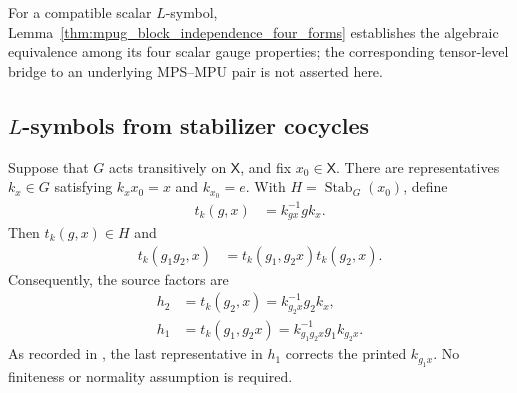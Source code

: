 For a compatible scalar $L$-symbol,
Lemma~\ref{thm:mpug_block_independence_four_forms} establishes the
algebraic equivalence among its four scalar gauge properties; the corresponding
tensor-level bridge to an underlying MPS--MPU pair is not asserted here.

\subsection{\texorpdfstring{$L$}{L}-symbols from stabilizer cocycles}

\begin{lemma}
    \label{thm:mpug_stabilizer_transition}
    \leanok
    Suppose that $G$ acts transitively on $\mathsf X$, and fix
    $x_0\in\mathsf X$. There are representatives $k_x\in G$ satisfying
    $k_xx_0=x$ and $k_{x_0}=e$. With
    $H=\operatorname{Stab}_G(x_0)$, define
    \begin{align}
        t_k(g,x)
         & =k_{g x}^{-1}gk_x.
        \label{eq:mpug_stabilizer_transition}
    \end{align}
    Then $t_k(g,x)\in H$ and
    \begin{align}
        t_k(g_1g_2,x)
         & =t_k(g_1,g_2x)t_k(g_2,x).
        \label{eq:mpug_stabilizer_transition_product}
    \end{align}
    Consequently, the source factors are
    \begin{align}
        h_2
         & =t_k(g_2,x)=k_{g_2x}^{-1}g_2k_x,
        \label{eq:mpug_stabilizer_h2}                  \\
        h_1
         & =t_k(g_1,g_2x)=k_{g_1g_2x}^{-1}g_1k_{g_2x}.
        \label{eq:mpug_stabilizer_h1}
    \end{align}
    As recorded in \cite{gap:fbc25_stabilizer_transition_index_typo}, the last
    representative in $h_1$ corrects the printed $k_{g_1x}$. No finiteness or
    normality assumption is required.
\end{lemma}

